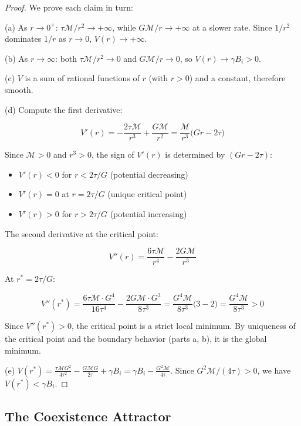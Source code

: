 \documentclass[11pt]{article}
\theoremstyle{plain}
\theoremstyle{definition}
\theoremstyle{remark}
\let\origsubsection\subsection
\renewcommand{\subsection}{\needspace{7\baselineskip}\origsubsection}
\begin{document}
\begin{proof}
We prove each claim in turn:

(a) As $r \to 0^+$: $\tau \mathcal{M}/r^2 \to +\infty$, while $G\mathcal{M}/r \to +\infty$ at a slower rate. Since $1/r^2$ dominates $1/r$ as $r \to 0$, $V(r) \to +\infty$.

(b) As $r \to \infty$: both $\tau\mathcal{M}/r^2 \to 0$ and $G\mathcal{M}/r \to 0$, so $V(r) \to \gamma B_i > 0$.

(c) $V$ is a sum of rational functions of $r$ (with $r > 0$) and a constant, therefore smooth.

(d) Compute the first derivative:

$$V'(r) = -\frac{2\tau\mathcal{M}}{r^3} + \frac{G\mathcal{M}}{r^2} = \frac{\mathcal{M}}{r^3}\bigl(Gr - 2\tau\bigr)$$

Since $\mathcal{M} > 0$ and $r^3 > 0$, the sign of $V'(r)$ is determined by $(Gr - 2\tau)$:

\begin{itemize}
\item $V'(r) < 0$ for $r < 2\tau/G$ (potential decreasing)
\item $V'(r) = 0$ at $r = 2\tau/G$ (unique critical point)
\item $V'(r) > 0$ for $r > 2\tau/G$ (potential increasing)
\end{itemize}
The second derivative at the critical point:

$$V''(r) = \frac{6\tau\mathcal{M}}{r^4} - \frac{2G\mathcal{M}}{r^3}$$

At $r^* = 2\tau/G$:

$$V''(r^*) = \frac{6\tau\mathcal{M} \cdot G^4}{16\tau^4} - \frac{2G\mathcal{M} \cdot G^3}{8\tau^3} = \frac{G^4\mathcal{M}}{8\tau^3}\bigl(3 - 2\bigr) = \frac{G^4\mathcal{M}}{8\tau^3} > 0$$

Since $V''(r^*) > 0$, the critical point is a strict local minimum. By uniqueness of the critical point and the boundary behavior (parts a, b), it is the global minimum.

(e) $V(r^*) = \frac{\tau\mathcal{M}G^2}{4\tau^2} - \frac{G\mathcal{M}G}{2\tau} + \gamma B_i = \gamma B_i - \frac{G^2\mathcal{M}}{4\tau}$. Since $G^2\mathcal{M}/(4\tau) > 0$, we have $V(r^*) < \gamma B_i$.
\end{proof}

\subsection{The Coexistence Attractor}\label{the-coexistence-attractor}
\end{document}

